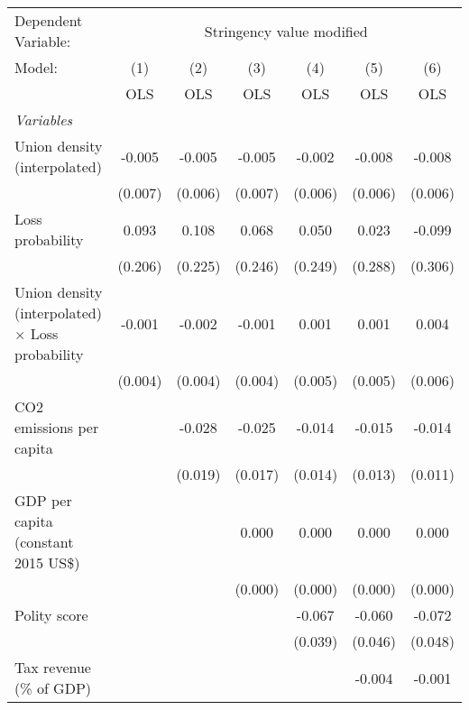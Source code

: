 
\begingroup
\centering
\begin{tabular}{lcccccc}
   \toprule
   Dependent Variable: & \multicolumn{6}{c}{Stringency value modified}\\
   Model:                                                  & (1)     & (2)     & (3)     & (4)     & (5)     & (6)\\  
                                                           &  OLS    & OLS     & OLS     & OLS     & OLS     & OLS\\  
   \midrule
   \emph{Variables}\\
   Union density (interpolated)                            & -0.005  & -0.005  & -0.005  & -0.002  & -0.008  & -0.008\\   
                                                           & (0.007) & (0.006) & (0.007) & (0.006) & (0.006) & (0.006)\\   
   Loss probability                                        & 0.093   & 0.108   & 0.068   & 0.050   & 0.023   & -0.099\\   
                                                           & (0.206) & (0.225) & (0.246) & (0.249) & (0.288) & (0.306)\\   
   Union density (interpolated) $\times$ Loss probability  & -0.001  & -0.002  & -0.001  & 0.001   & 0.001   & 0.004\\   
                                                           & (0.004) & (0.004) & (0.004) & (0.005) & (0.005) & (0.006)\\   
   CO2 emissions per capita                                &         & -0.028  & -0.025  & -0.014  & -0.015  & -0.014\\   
                                                           &         & (0.019) & (0.017) & (0.014) & (0.013) & (0.011)\\   
   GDP per capita (constant 2015 US\$)                     &         &         & 0.000   & 0.000   & 0.000   & 0.000\\   
                                                           &         &         & (0.000) & (0.000) & (0.000) & (0.000)\\   
   Polity score                                            &         &         &         & -0.067  & -0.060  & -0.072\\   
                                                           &         &         &         & (0.039) & (0.046) & (0.048)\\   
   Tax revenue (\% of GDP)                                 &         &         &         &         & -0.004  & -0.001\\   

\end{tabular}
